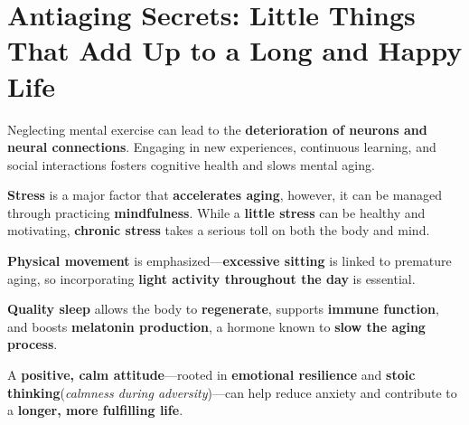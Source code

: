 \section*{Antiaging Secrets: Little Things That Add Up to a Long and Happy Life}

Neglecting mental exercise can lead to the \textbf{deterioration of neurons and neural connections}. Engaging in new experiences, continuous learning, and social interactions fosters cognitive health and slows mental aging. 

\textbf{Stress} is a major factor that \textbf{accelerates aging}, however, it can be managed through practicing \textbf{mindfulness}. While a \textbf{little stress} can be healthy and motivating, \textbf{chronic stress} takes a serious toll on both the body and mind.

\textbf{Physical movement} is emphasized—\textbf{excessive sitting} is linked to premature aging, so incorporating \textbf{light activity throughout the day} is essential. 

\textbf{Quality sleep} allows the body to \textbf{regenerate}, supports \textbf{immune function}, and boosts \textbf{melatonin production}, a hormone known to \textbf{slow the aging process}. 

A \textbf{positive, calm attitude}—rooted in \textbf{emotional resilience} and \textbf{stoic thinking}(\textit{calmness during adversity})—can help reduce anxiety and contribute to a \textbf{longer, more fulfilling life}.

